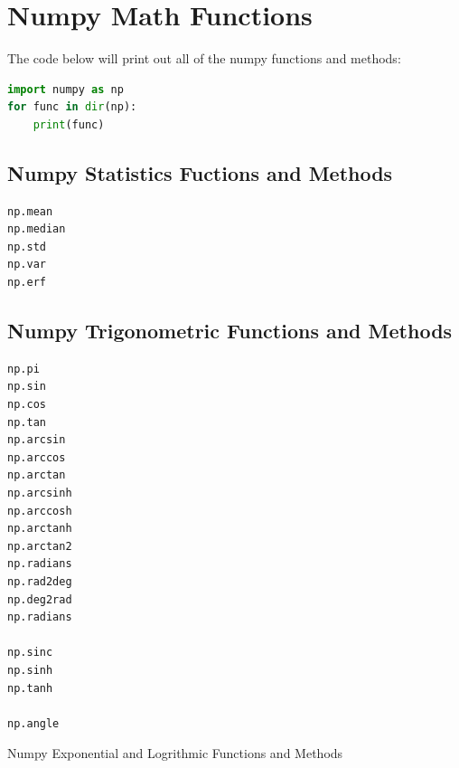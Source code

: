 \documentclass{book}
\begin{document}
        \section{Numpy Math Functions}\label{numpy-math-functions}
    




    
        The code below will print out all of the numpy functions and methods:
    




    
        \begin{lstlisting}[language=Python]
import numpy as np
for func in dir(np):
    print(func)
\end{lstlisting}
    




    
        \subsection{Numpy Statistics Fuctions and
Methods}\label{numpy-statistics-fuctions-and-methods}
    




    
        \begin{lstlisting}
np.mean
np.median
np.std
np.var
np.erf
\end{lstlisting}
    




    
        \subsection{Numpy Trigonometric Functions and
Methods}\label{numpy-trigonometric-functions-and-methods}
    




    
        \begin{lstlisting}
np.pi
np.sin
np.cos
np.tan
np.arcsin
np.arccos
np.arctan
np.arcsinh
np.arccosh
np.arctanh
np.arctan2
np.radians
np.rad2deg
np.deg2rad
np.radians

np.sinc
np.sinh
np.tanh

np.angle
\end{lstlisting}
    




    
        Numpy Exponential and Logrithmic Functions and Methods
    
\end{document}
